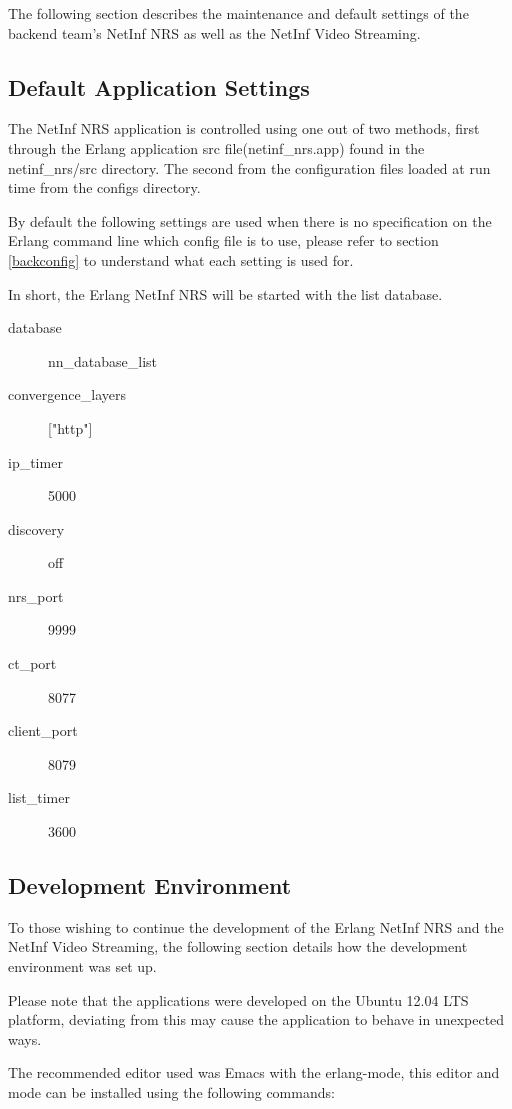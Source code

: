 The following section describes the maintenance and default settings of the backend team's NetInf NRS as well as the NetInf Video Streaming.

\subsection{Default Application Settings}

The NetInf NRS application is controlled using one out of two methods, first through the Erlang application src file(netinf\_nrs.app) 
found in the netinf\_nrs/src directory. The second from the configuration files loaded at run time from the configs directory. 

By default the following settings are used when there is no specification on the Erlang command line which config file is to use, 
please refer to section \ref{backconfig} to understand what each setting is used for. 

In short, the Erlang NetInf NRS will be started with the list database.

\begin{description}
\item[database]
nn\_database\_list
\item[convergence\_layers]
["http"]
\item[ip\_timer]
5000
\item[discovery]
off
\item[nrs\_port]
9999
\item[ct\_port]
8077
\item[client\_port]
8079
\item[list\_timer]
3600
\end{description}

\subsection {Development Environment}

To those wishing to continue the development of the Erlang NetInf NRS and the NetInf Video Streaming, the following 
section details how the development environment was set up. 

Please note that the applications were developed on the Ubuntu 12.04 LTS platform, deviating from this may cause the 
application to behave in unexpected ways.

The recommended editor used was Emacs with the erlang-mode, this editor and mode can be installed using the following commands:

